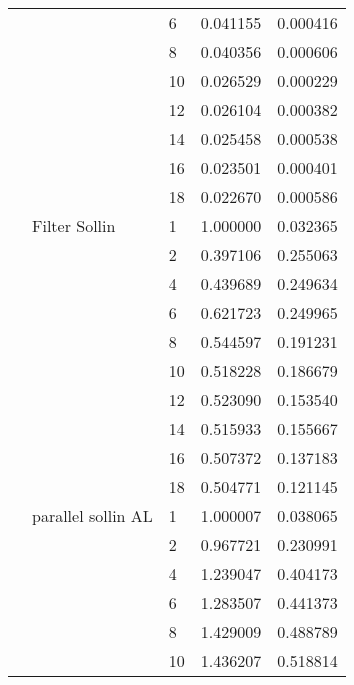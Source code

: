 \begin{tabular}{lllrr}
                      &                     & 6  &  0.041155 &  0.000416 \\
                      &                     & 8  &  0.040356 &  0.000606 \\
                      &                     & 10 &  0.026529 &  0.000229 \\
                      &                     & 12 &  0.026104 &  0.000382 \\
                      &                     & 14 &  0.025458 &  0.000538 \\
                      &                     & 16 &  0.023501 &  0.000401 \\
                      &                     & 18 &  0.022670 &  0.000586 \\
                      & Filter Sollin & 1  &  1.000000 &  0.032365 \\
                      &                     & 2  &  0.397106 &  0.255063 \\
                      &                     & 4  &  0.439689 &  0.249634 \\
                      &                     & 6  &  0.621723 &  0.249965 \\
                      &                     & 8  &  0.544597 &  0.191231 \\
                      &                     & 10 &  0.518228 &  0.186679 \\
                      &                     & 12 &  0.523090 &  0.153540 \\
                      &                     & 14 &  0.515933 &  0.155667 \\
                      &                     & 16 &  0.507372 &  0.137183 \\
                      &                     & 18 &  0.504771 &  0.121145 \\
                      & parallel sollin AL & 1  &  1.000007 &  0.038065 \\
                      &                     & 2  &  0.967721 &  0.230991 \\
                      &                     & 4  &  1.239047 &  0.404173 \\
                      &                     & 6  &  1.283507 &  0.441373 \\
                      &                     & 8  &  1.429009 &  0.488789 \\
                      &                     & 10 &  1.436207 &  0.518814 \\

\end{tabular}
